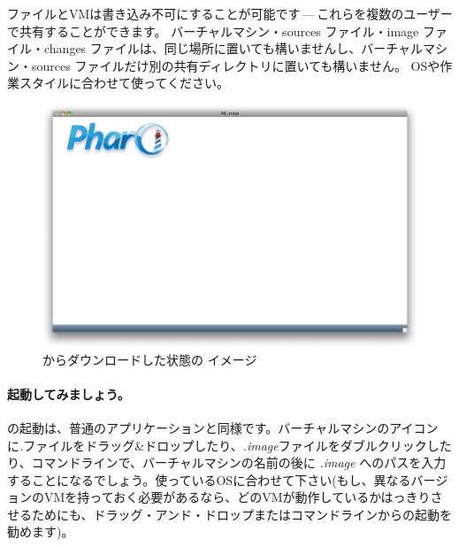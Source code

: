 \documentclass[a4paper,10pt,twoside]{book}
\begin{document}
 ファイルとVMは書き込み不可にすることが可能です\,---\,これらを複数のユーザーで共有することができます。
バーチャルマシン・sources ファイル・image ファイル・changes ファイルは、同じ場所に置いても構いませんし、バーチャルマシン・sources ファイルだけ別の共有ディレクトリに置いても構いません。
OSや作業スタイルに合わせて使ってください。


\begin{figure}[htb]
\centerline {\includegraphics[width=\textwidth]{startup}}
\caption{\pbe からダウンロードした状態の イメージ}
\end{figure}

\paragraph{起動してみましょう。} \pharo の起動は、普通のアプリケーションと同様です。バーチャルマシンのアイコンに\emph{.}ファイルをドラッグ&ドロップしたり、\emph{.image}ファイルをダブルクリックしたり、コマンドラインで、バーチャルマシンの名前の後に \emph{.image} へのパスを入力することになるでしょう。使っているOSに合わせて下さい(もし、異なるバージョンのVMを持っておく必要があるなら、どのVMが動作しているかはっきりさせるためにも、ドラッグ・アンド・ドロップまたはコマンドラインからの起動を勧めます)。
\end{document}
